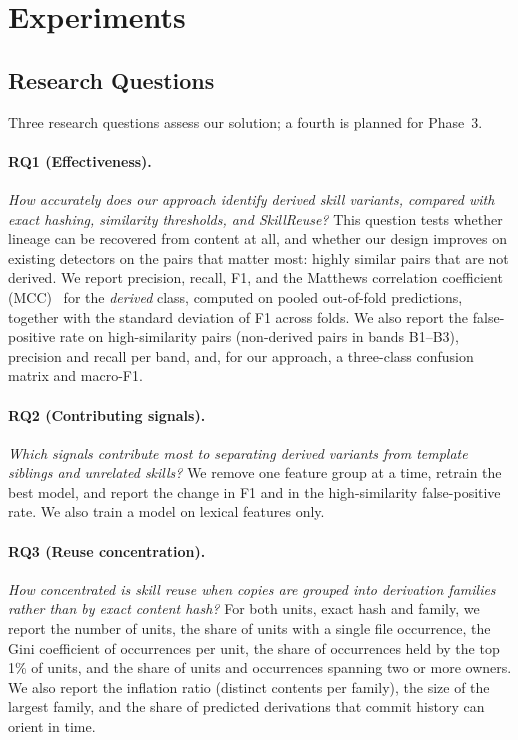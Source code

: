 \section{Experiments}
\label{sec:experiments}

\subsection{Research Questions}

Three research questions assess our solution; a fourth is planned for Phase~3.

\paragraph{RQ1 (Effectiveness).} \emph{How accurately does our approach identify derived skill
variants, compared with exact hashing, similarity thresholds, and SkillReuse?} This question
tests whether lineage can be recovered from content at all, and whether our design improves on
existing detectors on the pairs that matter most: highly similar pairs that are not derived.
We report precision, recall, F1, and the Matthews correlation coefficient
(MCC)~\cite{chicco2020mcc} for the \emph{derived} class, computed on pooled out-of-fold
predictions, together with the standard deviation of F1 across folds. We also report the
false-positive rate on high-similarity pairs (non-derived pairs in bands B1--B3), precision and
recall per band, and, for our approach, a three-class confusion matrix and macro-F1.

\paragraph{RQ2 (Contributing signals).} \emph{Which signals contribute most to separating
derived variants from template siblings and unrelated skills?} We remove one feature group at
a time, retrain the best model, and report the change in F1 and in the high-similarity
false-positive rate. We also train a model on lexical features only.

\paragraph{RQ3 (Reuse concentration).} \emph{How concentrated is skill reuse when copies are
grouped into derivation families rather than by exact content hash?} For both units, exact
hash and family, we report the number of units, the share of units with a single file
occurrence, the Gini coefficient of occurrences per unit, the share of occurrences held by
the top 1\% of units, and the share of units and occurrences spanning two or more owners. We
also report the inflation ratio (distinct contents per family), the size of the largest
family, and the share of predicted derivations that commit history can orient in time.

